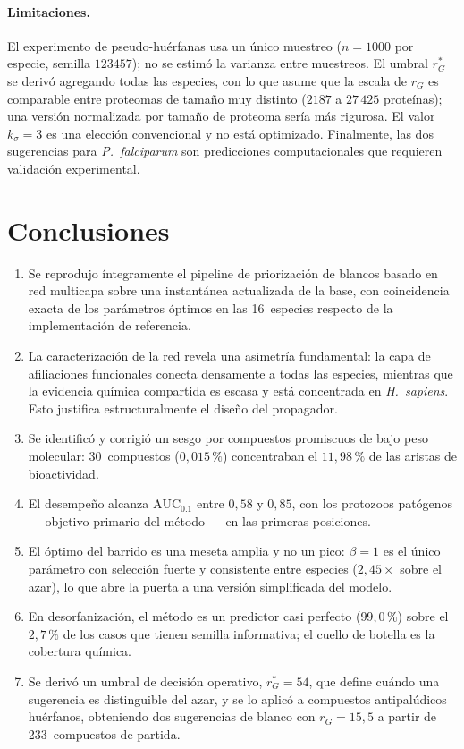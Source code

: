 \documentclass[11pt,a4paper]{article}
\newcommand{\AUCcero}{\text{AUC}_{0.1}}
\newcommand{\rG}{r_{G}}
\newcommand{\rGe}{r_{G}^{\ast}}
\newcommand{\spn}[1]{\textit{#1}}
\begin{document}
\paragraph{Limitaciones.} El experimento de pseudo-huérfanas usa un único
muestreo ($n = 1000$ por especie, semilla $123457$); no se estimó la varianza
entre muestreos. El umbral $\rGe$ se derivó agregando todas las especies, con lo
que asume que la escala de $\rG$ es comparable entre proteomas de tamaño muy
distinto ($2187$ a $27\,425$ proteínas); una versión normalizada por tamaño de
proteoma sería más rigurosa. El valor $k_\sigma = 3$ es una elección
convencional y no está optimizado. Finalmente, las dos sugerencias para
\spn{P.~falciparum} son predicciones computacionales que requieren validación
experimental.

\section{Conclusiones}

\begin{enumerate}
  \item Se reprodujo íntegramente el pipeline de priorización de blancos basado
    en red multicapa sobre una instantánea actualizada de la base, con
    coincidencia exacta de los parámetros óptimos en las 16~especies respecto de
    la implementación de referencia.
  \item La caracterización de la red revela una asimetría fundamental: la capa
    de afiliaciones funcionales conecta densamente a todas las especies,
    mientras que la evidencia química compartida es escasa y está concentrada en
    \spn{H.~sapiens}. Esto justifica estructuralmente el diseño del propagador.
  \item Se identificó y corrigió un sesgo por compuestos promiscuos de bajo peso
    molecular: 30~compuestos ($0{,}015\,\%$) concentraban el $11{,}98\,\%$ de las
    aristas de bioactividad.
  \item El desempeño alcanza $\AUCcero$ entre $0{,}58$ y $0{,}85$, con los
    protozoos patógenos --- objetivo primario del método --- en las primeras
    posiciones.
  \item El óptimo del barrido es una meseta amplia y no un pico: $\beta = 1$ es
    el único parámetro con selección fuerte y consistente entre especies
    ($2{,}45\times$ sobre el azar), lo que abre la puerta a una versión
    simplificada del modelo.
  \item En desorfanización, el método es un predictor casi perfecto
    ($99{,}0\,\%$) sobre el $2{,}7\,\%$ de los casos que tienen semilla
    informativa; el cuello de botella es la cobertura química.
  \item Se derivó un umbral de decisión operativo, $\rGe = 54$, que define
    cuándo una sugerencia es distinguible del azar, y se lo aplicó a compuestos
    antipalúdicos huérfanos, obteniendo dos sugerencias de blanco con
    $\rG = 15{,}5$ a partir de 233~compuestos de partida.
\end{enumerate}



\end{document}
